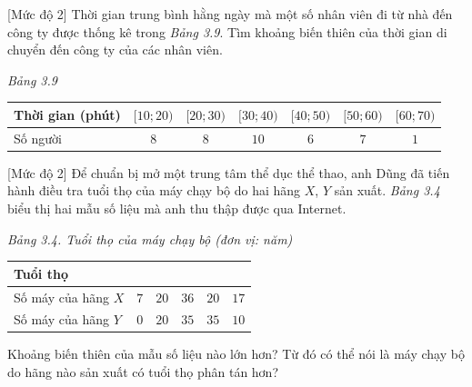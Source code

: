 \begin{bt}%
[Mức độ 2]
	Thời gian trung bình hằng ngày mà một số nhân viên đi từ nhà đến công ty được thống kê trong  \textit{Bảng 3.9}. Tìm khoảng biến thiên của thời gian di chuyển đến công ty của các nhân viên.
	\begin{center}
		\textit{	Bảng 3.9}\\
		\begin{tabular}{|l|c|c|c|c|c|c|}
			\hline Thời gian (phút)  & {$[10 ; 20)$} & {$[20 ; 30)$} & {$[30 ; 40)$} & {$[40 ; 50)$} & {$[50 ; 60)$} & {$[60 ; 70)$} \\
			\hline Số người  & $8$ & $8$ & $10$ & $6$ & $7$ & $1$ \\
			\hline
		\end{tabular}
	\end{center}
	
\end{bt}

\begin{bt}%
[Mức độ 2]
Để chuẩn bị mở một trung tâm thể dục thể thao, anh Dũng đã tiến hành điều tra tuổi thọ của máy chạy bộ do hai hãng $X$, $Y$ sản xuất. {\it Bảng 3.4} biểu thị hai mẫu số liệu mà anh thu thập được qua Internet.
\begin{center}
	{\it Bảng 3.4. Tuổi thọ của máy chạy bộ (đơn vị: năm)}
	\begin{tabular}{|p{5cm}|p{1.7cm}|p{1.7cm}|p{1.7cm}|p{1.7cm}|p{1.7cm}|}
		\hline Tuổi thọ &\centering\arraybackslash {$[2; 4)$} &\centering\arraybackslash {$[4; 6)$} &\centering\arraybackslash {$[6; 8)$} &\centering\arraybackslash {$[8; 10)$} &\centering\arraybackslash {$[10; 12)$} \\
		\hline Số máy của hãng $X$&\centering\arraybackslash $7$ &\centering\arraybackslash $20$ &\centering\arraybackslash $36$ &\centering\arraybackslash $20$ &\centering\arraybackslash $17$\\
		\hline Số máy của hãng $Y$&\centering\arraybackslash $0$ &\centering\arraybackslash $20$ &\centering\arraybackslash $35$ &\centering\arraybackslash $35$ &\centering\arraybackslash $10$\\
		\hline
	\end{tabular}
\end{center}
Khoảng biến thiên của mẫu số liệu nào lớn hơn? Từ đó có thể nói là máy chạy bộ do hãng nào sản xuất có tuổi thọ phân tán hơn?
\end{bt}

